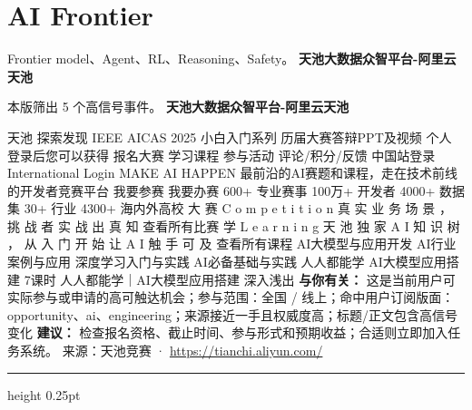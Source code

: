\documentclass[10.5pt]{ctexart}
\begin{document}
\section*{AI Frontier}
{\color{ormuted} Frontier model、Agent、RL、Reasoning、Safety。}
\vspace{2mm}
{\LARGE\bfseries 天池大数据众智平台-阿里云天池}\par
\vspace{1mm}
{\color{ormuted} 本版筛出 5 个高信号事件。}
\vspace{3mm}
{\Large\bfseries 天池大数据众智平台-阿里云天池}\par
天池 探索发现 IEEE AICAS 2025 小白入门系列 历届大赛答辩PPT及视频 个人 登录后您可以获得 报名大赛 学习课程 参与活动 评论/积分/反馈 中国站登录 International Login MAKE AI HAPPEN 最前沿的AI赛题和课程，走在技术前线的开发者竞赛平台 我要参赛 我要办赛 600+ 专业赛事 100万+ 开发者 4000+ 数据集 30+ 行业 4300+ 海内外高校 大 赛 C o m p e t i t i o n 真 实 业 务 场 景 ， 挑 战 者 实 战 出 真 知 查看所有比赛 学 L e a r n i n g 天 池 独 家 A I 知 识 树 ， 从 入 门 开 始 让 A I 触 手 可 及 查看所有课程 AI大模型与应用开发 AI行业案例与应用 深度学习入门与实践 AI必备基础与实践 人人都能学 AI大模型应用搭建 7课时 人人都能学｜AI大模型应用搭建 深入浅出
\textbf{与你有关：} 这是当前用户可实际参与或申请的高可触达机会；参与范围：全国 / 线上；命中用户订阅版面：opportunity、ai、engineering；来源接近一手且权威度高；标题/正文包含高信号变化
\textbf{建议：} 检查报名资格、截止时间、参与形式和预期收益；合适则立即加入任务系统。
{\footnotesize\color{ormuted} 来源：天池竞赛 · \url{https://tianchi.aliyun.com/}}
\vspace{4mm}
\hrule height 0.25pt
\vspace{3mm}
\end{document}
